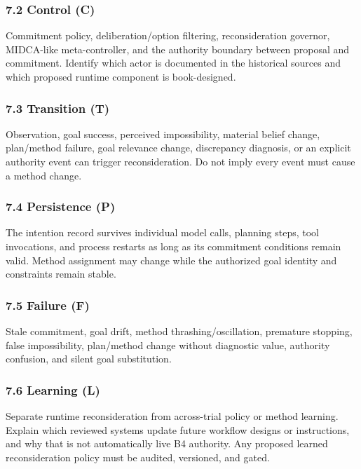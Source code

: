 \subsubsection{7.2 Control (C)}\label{control-c}

Commitment policy, deliberation/option filtering, reconsideration governor, MIDCA-like meta-controller, and the authority boundary between proposal and commitment. Identify which actor is documented in the historical sources and which proposed runtime component is book-designed.

\subsubsection{7.3 Transition (T)}\label{transition-t}

Observation, goal success, perceived impossibility, material belief change, plan/method failure, goal relevance change, discrepancy diagnosis, or an explicit authority event can trigger reconsideration. Do not imply every event must cause a method change.

\subsubsection{7.4 Persistence (P)}\label{persistence-p}

The intention record survives individual model calls, planning steps, tool invocations, and process restarts as long as its commitment conditions remain valid. Method assignment may change while the authorized goal identity and constraints remain stable.

\subsubsection{7.5 Failure (F)}\label{failure-f}

Stale commitment, goal drift, method thrashing/oscillation, premature stopping, false impossibility, plan/method change without diagnostic value, authority confusion, and silent goal substitution.

\subsubsection{7.6 Learning (L)}\label{learning-l}

Separate runtime reconsideration from across-trial policy or method learning. Explain which reviewed systems update future workflow designs or instructions, and why that is not automatically live B4 authority. Any proposed learned reconsideration policy must be audited, versioned, and gated.

